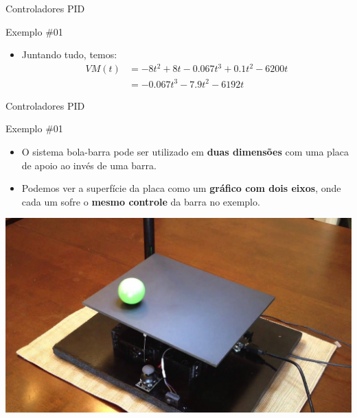 \begin{frame}{Controladores PID}
	\begin{block}{Exemplo \#01}
		\begin{itemize}
			\item Juntando tudo, temos:
			\begin{align*}
				VM(t)&=-8t^{2}+8t-\num{0.067}t^{3}+\num{0.1}t^{2}-6200t\\
					&=-\num{0.067}t^{3}-\num{7.9}t^{2}-6192t
			\end{align*}
		\end{itemize}
	\end{block}
\end{frame}


\begin{frame}{Controladores PID}
	\begin{block}{Exemplo \#01}
		\begin{itemize}
			\item O sistema bola-barra pode ser utilizado em \textbf{duas dimensões} com uma placa de apoio ao invés de uma barra.
			\item Podemos ver a superfície da placa como um \textbf{gráfico com dois eixos}, onde cada um sofre o \textbf{mesmo controle} da barra no exemplo.
		\end{itemize}
	\end{block}
	
	\centering
	
	\includegraphics[width=0.7\linewidth]{Figuras/Ch13/fig5}
\end{frame}


